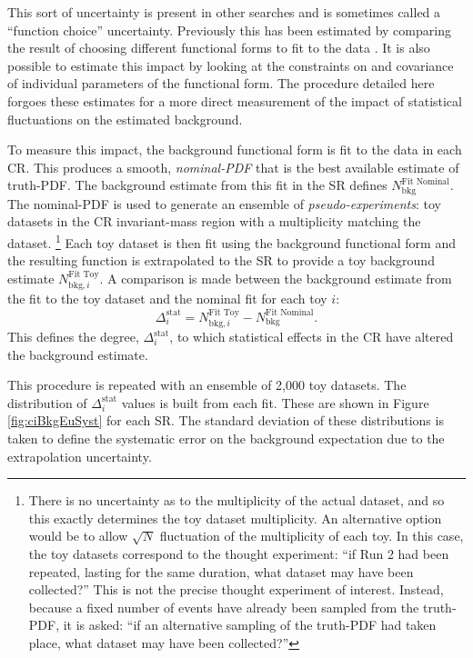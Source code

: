 This sort of uncertainty is present in other searches and is sometimes called a ``function choice'' uncertainty.
Previously this has been estimated by comparing the result of choosing different functional forms to fit to the data \cite{wprime}.
It is also possible to estimate this impact by looking at the constraints on and covariance of individual parameters of the functional form.
The procedure detailed here forgoes these estimates for a more direct measurement of the impact of statistical fluctuations on the estimated background.

To measure this impact, the background functional form is fit to the data in each CR.
This produces a smooth, \emph{nominal-PDF} that is the best available estimate of truth-PDF.
The background estimate from this fit in the SR defines $N_\text{bkg}^\text{Fit Nominal}$.
The nominal-PDF is used to generate an ensemble of \emph{pseudo-experiments}: toy datasets in the CR invariant-mass region with a multiplicity matching the dataset.
\footnote{There is no uncertainty as to the multiplicity of the actual dataset, and so this exactly determines the toy dataset multiplicity. An alternative option would be to allow $\sqrt{N}$ fluctuation of the multiplicity of each toy. In this case, the toy datasets correspond to the thought experiment: ``if Run 2 had been repeated, lasting for the same duration, what dataset may have been collected?'' This is not the precise thought experiment of interest. Instead, because a fixed number of events have already been sampled from the truth-PDF, it is asked: ``if an alternative sampling of the truth-PDF had taken place, what dataset may have been collected?''}
Each toy dataset is then fit using the background functional form and the resulting function is extrapolated to the SR to provide a toy background estimate $N_{\text{bkg},i}^\text{Fit Toy}$.
A comparison is made between the background estimate from the fit to the toy dataset and the nominal fit for each toy $i$:
\begin{equation*}
    \Delta_i^\text{stat}=N_{\text{bkg},i}^\text{Fit Toy}-N_\text{bkg}^\text{Fit Nominal}.
\end{equation*}
This defines the degree, $\Delta_i^\text{stat}$, to which statistical effects in the CR have altered the background estimate.


This procedure is repeated with an ensemble of 2,000 toy datasets.
The distribution of $\Delta_i^\text{stat}$ values is built from each fit. These are shown in Figure \ref{fig:ciBkgEuSyst} for each SR.
The standard deviation of these distributions is taken to define the systematic error on the background expectation due to the extrapolation uncertainty.

